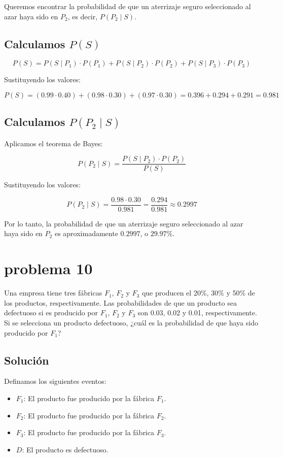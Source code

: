 \documentclass[12pt,a4paper]{article}
\begin{document}
Queremos encontrar la probabilidad de que un aterrizaje seguro seleccionado al azar haya sido en \( P_2 \), es decir, \( P(P_2 \mid S) \).

\subsection*{ Calculamos \( P(S) \)}

\[
P(S) = P(S \mid P_1) \cdot P(P_1) + P(S \mid P_2) \cdot P(P_2) + P(S \mid P_3) \cdot P(P_3)
\]

Sustituyendo los valores:

\[
P(S) = (0.99 \cdot 0.40) + (0.98 \cdot 0.30) + (0.97 \cdot 0.30) = 0.396 + 0.294 + 0.291 = 0.981
\]

\subsection*{ Calculamos \( P(P_2 \mid S) \)}

Aplicamos el teorema de Bayes:

\[
P(P_2 \mid S) = \frac{P(S \mid P_2) \cdot P(P_2)}{P(S)}
\]

Sustituyendo los valores:

\[
P(P_2 \mid S) = \frac{0.98 \cdot 0.30}{0.981} = \frac{0.294}{0.981} \approx 0.2997
\]

Por lo tanto, la probabilidad de que un aterrizaje seguro seleccionado al azar haya sido en \( P_2 \) es aproximadamente \( 0.2997 \), o \( 29.97\% \).

\section*{problema 10}
Una empresa tiene tres fábricas \( F_1 \), \( F_2 \) y \( F_3 \) que producen el 20\%, 30\% y 50\% de los productos, respectivamente. Las probabilidades de que un producto sea defectuoso si es producido por \( F_1 \), \( F_2 \) y \( F_3 \) son 0.03, 0.02 y 0.01, respectivamente. Si se selecciona un producto defectuoso, ¿cuál es la probabilidad de que haya sido producido por \( F_1 \)?

\subsection*{Solución}

Definamos los siguientes eventos:
\begin{itemize}
    \item \( F_1 \): El producto fue producido por la fábrica \( F_1 \).
    \item \( F_2 \): El producto fue producido por la fábrica \( F_2 \).
    \item \( F_3 \): El producto fue producido por la fábrica \( F_3 \).
    \item \( D \): El producto es defectuoso.
\end{itemize}
\end{document}
